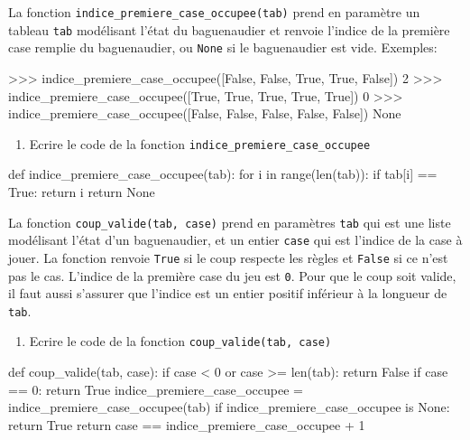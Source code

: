 \medskip

 La fonction \verb|indice_premiere_case_occupee(tab)| prend en paramètre un tableau \texttt{tab} modélisant l'état du baguenaudier et renvoie l'indice de la première case remplie du baguenaudier, ou \texttt{None} si le baguenaudier est vide. Exemples:

    \begin{CodePythontexAlt}[TaillePolice=\large, Largeur=1\linewidth,Centre,Lignes=true,PremLigne=1]{}
>>> indice_premiere_case_occupee([False, False, True, True, False])
2
>>> indice_premiere_case_occupee([True, True, True, True, True])
0
>>> indice_premiere_case_occupee([False, False, False, False, False])
None
    \end{CodePythontexAlt}

    \begin{enumerate}[resume]
\item Ecrire le code de la fonction \verb|indice_premiere_case_occupee|
\end{enumerate}

\begin{blocvisible}[height=6]
    \begin{CodePythontexAlt}[TaillePolice=\large, Largeur=1\linewidth,Centre,Lignes=true,PremLigne=1]{}
    def indice_premiere_case_occupee(tab):
        for i in range(len(tab)):
            if tab[i] == True:
                return i
        return None
    \end{CodePythontexAlt}
\end{blocvisible}

\pagebreak


 La fonction \verb|coup_valide(tab, case)| prend en paramètres \texttt{tab} qui est une liste modélisant l'état d'un baguenaudier, et un entier \texttt{case} qui est l'indice de la case à jouer. La fonction renvoie \texttt{True} si le coup respecte les règles et \texttt{False} si ce n'est pas le cas. L'indice de la première case du jeu est \texttt{0}. Pour que le coup soit valide, il faut aussi s'assurer que l'indice est un entier positif inférieur à la longueur de \texttt{tab}.


 \begin{enumerate}[resume]
\item Ecrire le code de la fonction \verb|coup_valide(tab, case)|
\end{enumerate}

\begin{blocvisible}[height=6]
    \begin{CodePythontexAlt}[TaillePolice=\large, Largeur=1\linewidth,Centre,Lignes=true,PremLigne=1]{}
    def coup_valide(tab, case):
        if case < 0 or case >= len(tab):
            return False
        if case == 0:
            return True
        indice_premiere_case_occupee = indice_premiere_case_occupee(tab)
        if indice_premiere_case_occupee is None:
            return True
        return case == indice_premiere_case_occupee + 1
    \end{CodePythontexAlt}
\end{blocvisible}

